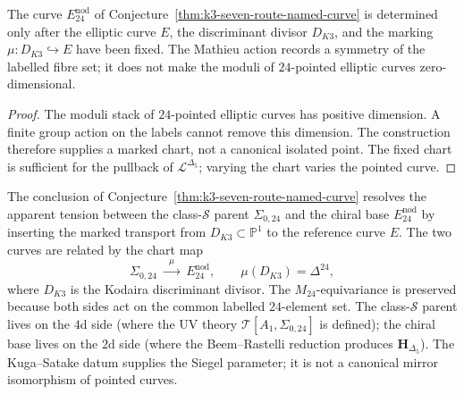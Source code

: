 \begin{corollary}
\label{cor:k3-named-curve-uniqueness}
The curve $E^{\mathrm{nod}}_{24}$ of
Conjecture~\ref{thm:k3-seven-route-named-curve} is determined only after the elliptic curve \(E\), the discriminant divisor \(D_{K3}\), and the marking \(\mu\colon D_{K3}\hookrightarrow E\) have been fixed. The Mathieu action records a symmetry of the labelled fibre set; it does not make the moduli of \(24\)-pointed elliptic curves zero-dimensional.
\end{corollary}

\begin{proof}
The moduli stack of \(24\)-pointed elliptic curves has positive dimension. A finite group action on the labels cannot remove this dimension. The construction therefore supplies a marked chart, not a canonical isolated point. The fixed chart is sufficient for the pullback of \(\mathcal L^{\Delta_5}\); varying the chart varies the pointed curve.
\end{proof}

\begin{remark}
\label{rem:k3-kuga-satake-mirror}
The conclusion of
Conjecture~\ref{thm:k3-seven-route-named-curve} resolves the apparent
tension between the class-$\mathcal{S}$ parent $\Sigma_{0,24}$ and the
chiral base $E^{\mathrm{nod}}_{24}$ by inserting the marked transport
from \(D_{K3}\subset\mathbb P^1\) to the reference curve \(E\). The two
curves are related by the chart map
\[
 \Sigma_{0,24}
 \;\xrightarrow{\;\;\mu\;\;}\;
 E^{\mathrm{nod}}_{24},
 \qquad
 \mu(D_{K3})=\Delta^{24},
\]
where \(D_{K3}\) is the Kodaira discriminant divisor. The $M_{24}$-equivariance is preserved because both sides act on the common labelled \(24\)-element set. The class-$\mathcal{S}$ parent lives on the
$4$d side (where the UV theory
$\mathcal{T}[A_1,\Sigma_{0,24}]$ is defined); the chiral base lives on
the $2$d side (where the Beem--Rastelli reduction produces
$\mathbf{H}_{\Delta_5}$). The Kuga--Satake datum supplies the Siegel parameter; it is not a canonical mirror isomorphism of pointed curves.
\end{remark}

